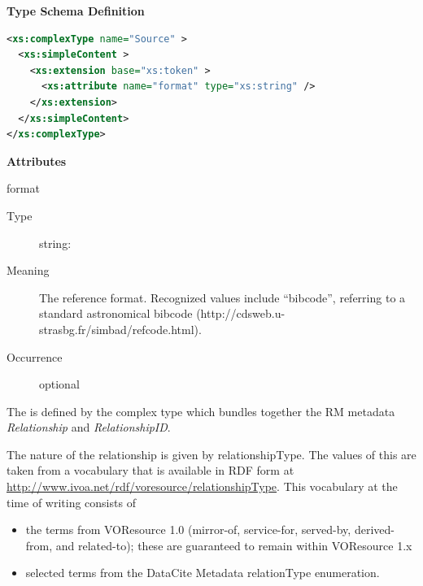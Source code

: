 \documentclass[11pt,a4paper]{ivoa}
\begin{document}
\begin{generated}
\begingroup
      	\renewcommand*\descriptionlabel[1]{%
      	\hbox to 5.5em{\emph{#1}\hfil}}\vspace{1ex}\noindent\textbf{ Type Schema Definition}

\begin{lstlisting}[language=XML,basicstyle=\footnotesize]
<xs:complexType name="Source" >
  <xs:simpleContent >
    <xs:extension base="xs:token" >
      <xs:attribute name="format" type="xs:string" />
    </xs:extension>
  </xs:simpleContent>
</xs:complexType>
\end{lstlisting}

\vspace{0.5ex}\noindent\textbf{ Attributes}

\begingroup\small\begin{bigdescription}
\item[format]
\begin{description}
\item[Type] string: 
\item[Meaning] 
                 The reference format.  Recognized values include “bibcode”, 
                 referring to a standard astronomical bibcode 
                 (http://cdsweb.u-strasbg.fr/simbad/refcode.html).  
               
\item[Occurrence] optional
\end{description}


\end{bigdescription}\endgroup

\endgroup
\end{generated}



The  is defined by the
 complex type which bundles together the
RM metadata \emph{Relationship} and
\emph{RelationshipID}.  

The nature of the relationship is given by relationshipType.  The values
of this are taken from a vocabulary that is available in RDF form at
\url{http://www.ivoa.net/rdf/voresource/relationshipType}.  This
vocabulary at the time of writing consists of 

\begin{itemize}
\item the terms from VOResource 1.0 (mirror-of, service-for, served-by,
derived-from, and related-to); these are guaranteed to remain within
VOResource 1.x
\item selected terms from the DataCite Metadata relationType enumeration.
\end{itemize}
\end{document}

